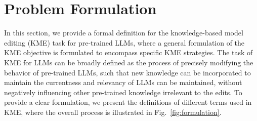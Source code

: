 \documentclass[acmsmall, screen]{acmart}
\begin{document}

\section{Problem Formulation}
\label{sec:prob_form}
In this section, we provide a formal definition for the knowledge-based model editing (KME) task for pre-trained LLMs, where a general formulation of the KME objective is formulated to encompass specific KME strategies. The task of KME for LLMs can be broadly defined as the process of precisely modifying the behavior of pre-trained LLMs, such that new knowledge can be incorporated to maintain the currentness and relevancy of LLMs can be maintained, without negatively influencing other pre-trained knowledge irrelevant to the edits. To provide a clear formulation, we present the definitions of different terms used in KME, where the overall process is illustrated in Fig.~\ref{fig:formulation}.
\end{document}
